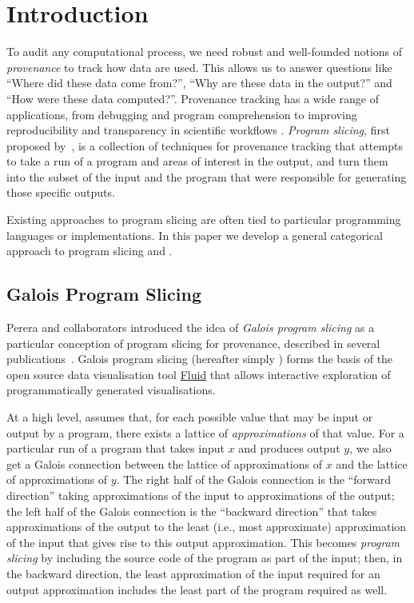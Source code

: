 \section{Introduction}
\label{sec:introduction}

To audit any computational process, we need robust and well-founded notions of \emph{provenance} to track how data are used. This allows us to answer questions like ``Where did these data come from?'', ``Why are these data in the output?'' and ``How were these data computed?''. Provenance tracking has a wide range of applications, from debugging and program comprehension  to improving reproducibility and transparency in scientific workflows . \emph{Program slicing}, first proposed by~\citet{weiser81}, is a collection of techniques for provenance tracking that attempts to take a run of a program and areas of interest in the output, and turn them into the subset of the input and the program that were responsible for generating those specific outputs.

Existing approaches to program slicing are often tied to particular programming languages or implementations. In this paper we develop a general categorical approach to program slicing and .

\subsection{Galois Program Slicing}
\label{sec:introduction:galois-slicing}

Perera and collaborators introduced the idea of {\em Galois program slicing} as a particular conception of program slicing for provenance, described in several publications~\cite{perera12a,perera16d,ricciotti17}. Galois program slicing (hereafter simply {\emph \GPS}) forms the basis of the open source data visualisation tool \href{https://f.luid.org/}{Fluid} that allows interactive exploration of programmatically generated visualisations.

At a high level, \GPS assumes that, for each possible value that may be input or output by a program, there exists a lattice of {\em approximations} of that value. For a particular run of a program that takes input $x$ and produces output $y$, we also get a Galois connection between the lattice of approximations of $x$ and the lattice of approximations of $y$. The right half of the Galois connection is the ``forward direction'' taking approximations of the input to approximations of the output; the left half of the Galois connection is the ``backward direction'' that takes approximations of the output to the least (i.e., most approximate) approximation of the input that gives rise to this output approximation. This becomes {\em program slicing} by including the source code of the program as part of the input; then, in the backward direction, the least approximation of the input required for an output approximation includes the least part of the program required as well.

